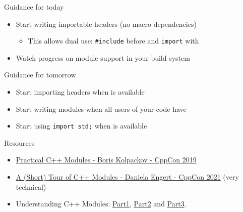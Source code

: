 \begin{frame}[fragile]
    \begin{exampleblock}{Guidance for today}
      \begin{itemize}
        \item Start writing importable headers (no macro dependencies)
        \begin{itemize}
          \item This allows dual use: \texttt{#include} before  and \texttt{import} with 
        \end{itemize}
        \item Watch progress on module support in your build system
      \end{itemize}
    \end{exampleblock}
    \begin{exampleblock}{Guidance for tomorrow}
      \begin{itemize}
        \item Start importing headers when  is available
        \item Start writing modules when all users of your code have 
        \item Start using \texttt{import std;} when  is available
      \end{itemize}
    \end{exampleblock}
\end{frame}

\begin{frame}[fragile]
    \begin{block}{Resources}
      \begin{itemize}
      \item \href{https://www.youtube.com/watch?v=szHV6RdQdg8}{Practical C++ Modules - Boris Kolpackov - CppCon 2019}
      \item \href{https://www.youtube.com/watch?v=nP8QcvPpGeM}{A (Short) Tour of C++ Modules - Daniela Engert - CppCon 2021} (very technical)
      \item Understanding C++ Modules: \href{https://vector-of-bool.github.io/2019/03/10/modules-1.html}{Part1}, \href{https://vector-of-bool.github.io/2019/03/31/modules-2.html}{Part2} and \href{https://vector-of-bool.github.io/2019/10/07/modules-3.html}{Part3}.
      \end{itemize}
    \end{block}
\end{frame}
